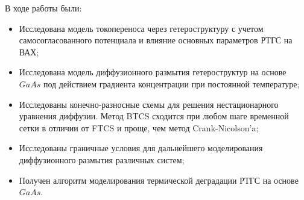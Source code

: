 \Conclusion
В ходе работы были:
\begin{itemize}
	\item Исследована модель токопереноса через гетероструктуру с учетом самосогласованного потенциала и влияние основных параметров РТГС на ВАХ; 
	\item Исследована модель диффузионного размытия гетероструктур на основе $GaAs$ под действием градиента концентрации при постоянной температуре;
	\item Исследованы конечно-разносные схемы для решения нестационарного уравнения диффузии. Метод BTCS сходится при любом шаге временной сетки в отличии от FTCS и проще, чем метод Crank-Nicolson'a; 
	\item Исследованы граничные условия для дальнейшего моделирования диффузионного размытия различных систем; 
	\item Получен алгоритм моделирования термической деградации РТГС на основе $GaAs$.
\end{itemize}